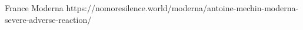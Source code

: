           {
            France
          }
          {
          }
          {
            Moderna
          }
          {
          }
          {
          }
          {
            https://nomoresilence.world/moderna/antoine-mechin-moderna-severe-adverse-reaction/
          }
